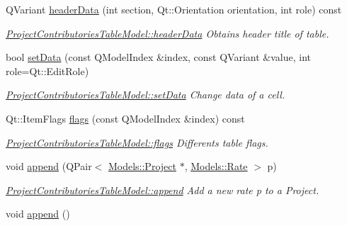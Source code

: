 \begin{DoxyCompactItemize}
Q\-Variant \hyperlink{classGui_1_1Widgets_1_1WdgModels_1_1ProjectContributoriesTableModel_af1d71ae6a06b69264301744beca91ad9}{header\-Data} (int section, Qt\-::\-Orientation orientation, int role) const 
\begin{DoxyCompactList}\small\item\em \hyperlink{classGui_1_1Widgets_1_1WdgModels_1_1ProjectContributoriesTableModel_af1d71ae6a06b69264301744beca91ad9}{Project\-Contributories\-Table\-Model\-::header\-Data} Obtains header title of table. \end{DoxyCompactList}\item 
bool \hyperlink{classGui_1_1Widgets_1_1WdgModels_1_1ProjectContributoriesTableModel_ac71dc1a97c5e62b4b51002ed737dad10}{set\-Data} (const Q\-Model\-Index \&index, const Q\-Variant \&value, int role=Qt\-::\-Edit\-Role)
\begin{DoxyCompactList}\small\item\em \hyperlink{classGui_1_1Widgets_1_1WdgModels_1_1ProjectContributoriesTableModel_ac71dc1a97c5e62b4b51002ed737dad10}{Project\-Contributories\-Table\-Model\-::set\-Data} Change data of a cell. \end{DoxyCompactList}\item 
Qt\-::\-Item\-Flags \hyperlink{classGui_1_1Widgets_1_1WdgModels_1_1ProjectContributoriesTableModel_a75dd68e78aec7823ef07a01e861ff627}{flags} (const Q\-Model\-Index \&index) const 
\begin{DoxyCompactList}\small\item\em \hyperlink{classGui_1_1Widgets_1_1WdgModels_1_1ProjectContributoriesTableModel_a75dd68e78aec7823ef07a01e861ff627}{Project\-Contributories\-Table\-Model\-::flags} Differents table flags. \end{DoxyCompactList}\item 
void \hyperlink{classGui_1_1Widgets_1_1WdgModels_1_1ProjectContributoriesTableModel_a7bb1cd1299d72ce4d6a35cc38bff5a70}{append} (Q\-Pair$<$ \hyperlink{classModels_1_1Project}{Models\-::\-Project} $\ast$, \hyperlink{classModels_1_1Rate}{Models\-::\-Rate} $>$ p)
\begin{DoxyCompactList}\small\item\em \hyperlink{classGui_1_1Widgets_1_1WdgModels_1_1ProjectContributoriesTableModel_a7bb1cd1299d72ce4d6a35cc38bff5a70}{Project\-Contributories\-Table\-Model\-::append} Add a new rate {\itshape p} to a Project. \end{DoxyCompactList}\item 
\hypertarget{classGui_1_1Widgets_1_1WdgModels_1_1ProjectContributoriesTableModel_a1ff13a691bf3609677318d6ad16f81a2}{void \hyperlink{classGui_1_1Widgets_1_1WdgModels_1_1ProjectContributoriesTableModel_a1ff13a691bf3609677318d6ad16f81a2}{append} ()}\label{classGui_1_1Widgets_1_1WdgModels_1_1ProjectContributoriesTableModel_a1ff13a691bf3609677318d6ad16f81a2}


\end{DoxyCompactItemize}
